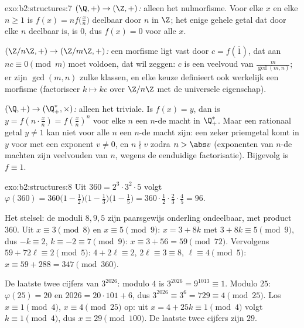 \begin{solution}{exo:b2:structures:7}
\emph{$(\Q,+) \to (\Z,+)$:} alleen het nulmorfisme. Voor elke $x$
en elke $n \geq 1$ is $f(x) = n f\bigl(\frac xn\bigr)$ deelbaar
door $n$ in $\Z$; het enige gehele getal dat door elke $n$
deelbaar is, is $0$, dus $f(x) = 0$ voor alle $x$.

\emph{$(\Z/n\Z, +) \to (\Z/m\Z, +)$:} een morfisme ligt vast door
$c = f(\overline 1)$, dat aan $n c \equiv 0 \pmod m$ moet voldoen,
dat wil zeggen: $c$ is een veelvoud van $\frac{m}{\gcd(m,n)}$; er
zijn $\gcd(m,n)$ zulke klassen, en elke keuze definieert ook
werkelijk een morfisme (factoriseer $k \mapsto kc$ over $\Z/n\Z$
met de universele eigenschap).

\emph{$(\Q, +) \to (\Q_+^*, \times)$:} alleen het triviale. Is
$f(x) = y$, dan is $y = f(n \cdot \frac xn) = f(\frac xn)^n$ voor
elke $n$ een $n$-de macht in $\Q_+^*$. Maar een rationaal getal $y
\neq 1$ kan niet voor alle $n$ een $n$-de macht zijn: een zeker
priemgetal komt in $y$ voor met een exponent $v \neq 0$, en $n
\nmid v$ zodra $n > \abs v$ (exponenten van $n$-de machten zijn
veelvouden van $n$, wegens de eenduidige factorisatie). Bijgevolg
is $f \equiv 1$.
\end{solution}

\begin{solution}{exo:b2:structures:8}
Uit $360 = 2^3 \cdot 3^2 \cdot 5$ volgt
$\varphi(360) = 360\bigl(1 - \tfrac12\bigr)\bigl(1 -
\tfrac13\bigr)\bigl(1 - \tfrac15\bigr) = 360 \cdot \tfrac12 \cdot
\tfrac23 \cdot \tfrac45 = 96$.

Het stelsel: de moduli $8, 9, 5$ zijn paarsgewijs onderling
ondeelbaar, met product $360$. Uit $x \equiv 3 \pmod 8$ en $x
\equiv 5 \pmod 9$: $x = 3 + 8k$ met $3 + 8k \equiv 5 \pmod 9$, dus
$-k \equiv 2$, $k \equiv -2 \equiv 7 \pmod 9$: $x \equiv 3 + 56 =
59 \pmod{72}$. Vervolgens $59 + 72\ell \equiv 2 \pmod 5$: $4 +
2\ell \equiv 2$, $2\ell \equiv 3 \equiv 8$, $\ell \equiv 4 \pmod
5$: $x \equiv 59 + 288 = 347 \pmod{360}$.

De laatste twee cijfers van $3^{2026}$: modulo $4$ is $3^{2026} =
9^{1013} \equiv 1$. Modulo $25$: $\varphi(25) = 20$ en $2026 =
20\cdot101 + 6$, dus $3^{2026} \equiv 3^6 = 729 \equiv 4
\pmod{25}$. Los $x \equiv 1 \pmod 4$, $x \equiv 4 \pmod{25}$ op:
uit $x = 4 + 25k \equiv 1 \pmod 4$ volgt $k \equiv 1 \pmod 4$,
dus $x \equiv 29 \pmod{100}$. De laatste twee cijfers zijn $29$.
\end{solution}

